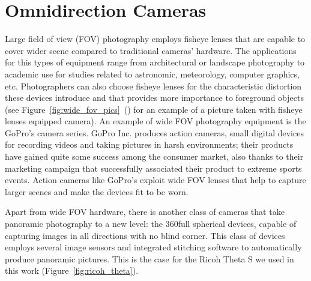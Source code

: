 \section{Omnidirection Cameras}
Large field of view (FOV) photography employs fisheye lenses that are capable to cover 
wider scene compared to traditional cameras' hardware.
The applications for this types of equipment range from architectural or 
landscape photography to academic use for studies related to astronomic, 
meteorology, computer graphics, etc.
Photographers can also choose fisheye lenses for the characteristic distortion
these devices introduce and that provides more importance to foreground objects
(see Figure~\ref{fig:wide_fov_pics}~() for an 
example of a picture taken with fisheye lenses equipped camera).
An example of wide FOV photography equipment is the GoPro's camera series.
GoPro Inc. produces action cameras, small digital devices for recording videos 
and taking pictures in harsh environments; their products have gained quite 
some success among the consumer market, also thanks to their marketing campaign 
that successfully associated their product to extreme sports events.
Action cameras like GoPro's exploit wide FOV lenses that help to capture larger
scenes and make the devices fit to be worn.

Apart from wide FOV hardware, there is another class of  
cameras that take panoramic photography to a new level: 
the 360\degree full spherical devices, capable of capturing images
in all directions with no blind corner. This class of devices employs 
several image sensors and integrated stitching software to automatically produce
panoramic pictures. This is the case for the Ricoh Theta S\texttrademark 
\cite{theta_website} we used in this work (Figure~\ref{fig:ricoh_theta}).

